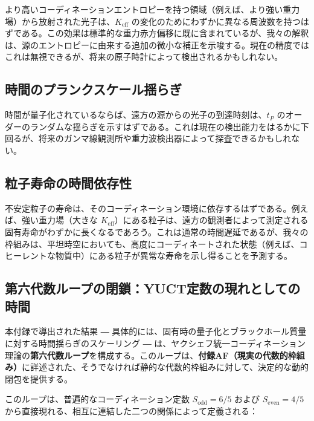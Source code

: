 \documentclass[12pt,a4paper]{article}
\newcommand{\Keff}{K_{\mathrm{eff}}}
\begin{document}
	より高いコーディネーションエントロピーを持つ領域（例えば、より強い重力場）から放射された光子は、\(\Keff\) の変化のためにわずかに異なる周波数を持つはずである。この効果は標準的な重力赤方偏移に既に含まれているが、我々の解釈は、源のエントロピーに由来する追加の微小な補正を示唆する。現在の精度ではこれは無視できるが、将来の原子時計によって検出されるかもしれない。
	
	\subsection{時間のプランクスケール揺らぎ}
	
	時間が量子化されているならば、遠方の源からの光子の到達時刻は、\(t_P\) のオーダーのランダムな揺らぎを示すはずである。これは現在の検出能力をはるかに下回るが、将来のガンマ線観測所や重力波検出器によって探査できるかもしれない。
	
	\subsection{粒子寿命の時間依存性}
	
	不安定粒子の寿命は、そのコーディネーション環境に依存するはずである。例えば、強い重力場（大きな \(\Keff\)）にある粒子は、遠方の観測者によって測定される固有寿命がわずかに長くなるであろう。これは通常の時間遅延であるが、我々の枠組みは、平坦時空においても、高度にコーディネートされた状態（例えば、コヒーレントな物質中）にある粒子が異常な寿命を示し得ることを予測する。
	
	\subsection{第六代数ループの閉鎖：YUCT定数の現れとしての時間}
	
	本付録で導出された結果 ― 具体的には、固有時の量子化とブラックホール質量に対する時間揺らぎのスケーリング ― は、ヤクシェフ統一コーディネーション理論の\textbf{第六代数ループ}を構成する。このループは、\textbf{付録AF（現実の代数的枠組み）}に詳述された、そうでなければ静的な代数的枠組みに対して、決定的な動的閉包を提供する。
	
	このループは、普遍的なコーディネーション定数 \(S_{\mathrm{odd}} = 6/5\) および \(S_{\mathrm{even}} = 4/5\) から直接現れる、相互に連結した二つの関係によって定義される：
	
\end{document}
